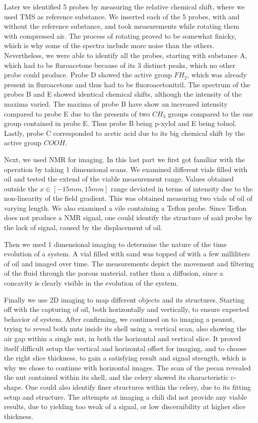 \documentclass[11 pt]{article}
\begin{document}
 Later we identified 5 probes by measuring the relative chemical shift, where we used TMS as reference substance.
 We inserted each of the 5 probes, with and without the reference substance, and took measurements while rotating them with compressed air. The process of rotating proved to be somewhat finicky, which is why some of the spectra include more noise than the others. Nevertheless, we were able to identify all the probes, starting with substance A, which had to be fluroacetone because of its 3 distinct peaks, which no other probe could produce. Probe D showed the active group $FH_2$, which was already present in fluroacetone and thus had to be fluoroacetonitril. The spectrum of the probes B and E showed identical chemical shifts, although the intensity of the maxima varied. The maxima of probe B have show an increased intensity compared to probe E due to the presents of two $CH_3$ groups compared to the one group contained in probe E. Thus probe B being p-xylol and E being toluol. Lastly, probe C corresponded to acetic acid due to its big chemical shift by the active group $COOH$.



  Next, we used NMR for imaging. In this last part we first got familiar with the operation by taking 1 dimensional scans. 
We examined different vials filled with oil and tested the extend of the viable measurement range. Values obtained outside the $x\in\left[-15mm, 15mm\right]$ range deviated in terms of intensity due to the non-linearity of the field gradient. This was obtained measuring two vials of oil of varying length. We also examined a vile containing a Teflon probe. Since Teflon does not produce a NMR signal, one could identify the structure of said probe by the lack of signal, caused by the displacement of oil.
  
Then we used 1 dimensional imaging to determine the nature of the time evolution of a system. A vial filled with sand was topped of with a few milliliters of oil and imaged over time. The measurements depict the movement and filtering of the fluid through the porous material, rather than a diffusion, since a concavity is clearly visible in the evolution of the system.

 
Finally we use 2D imaging to map different objects and its structures. Starting off with the capturing  of  oil, both horizontally and vertically, to ensure expected behavior of system. After confirming, we continued on to imaging a peanut, trying to reveal both nuts inside its shell using a vertical scan, also showing the air gap within a single nut, in both the horizontal and vertical slice.
It proved itself difficult setup the vertical and horizontal offset for imaging, and to choose the right slice thickness, to gain a satisfying result and signal strength, which is why we chose to continue with horizontal images. The scan of the pecan revealed the nut contained within its shell, and the celery showed its characteristic c-shape. One could also identify finer structures within the celery, due to its fitting setup and structure.
The attempts at imaging a chili did not provide any viable results, due to yielding too weak of a signal, or low discernibility at higher slice thickness.
\end{document}
